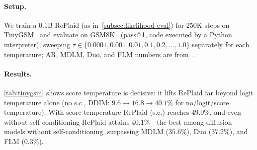 \documentclass{article}
\begin{document}
\paragraph{Setup.} We train a 0.1B RePlaid (as in~\cref{subsec:likelihood-eval}) for 250K steps on TinyGSM~\citep{liu2023tinygsm} and evaluate on GSM8K~\citep{cobbe2021gsm8k} (pass@1, code executed by a Python interpreter), sweeping $\tau\in\{0.0001, 0.001, 0.01, 0.1, 0.2, \ldots, 1.0\}$ separately for each temperature; AR, MDLM, Duo, and FLM numbers are from~\citet{deschenaux2026language}. 

\paragraph{Results.} \cref{tab:tinygsm} shows score temperature is decisive: it lifts RePlaid far beyond logit temperature alone (no s.c., DDIM: $9.6\to16.8\to40.1\%$ for no/logit/score temperature). With score temperature RePlaid (s.c.) reaches $49.0\%$, and even without self-conditioning RePlaid attains $40.1\%$---the best among diffusion models without self-conditioning, surpassing MDLM ($35.6\%$), Duo ($37.2\%$), and FLM ($0.3\%$). 


\end{document}
